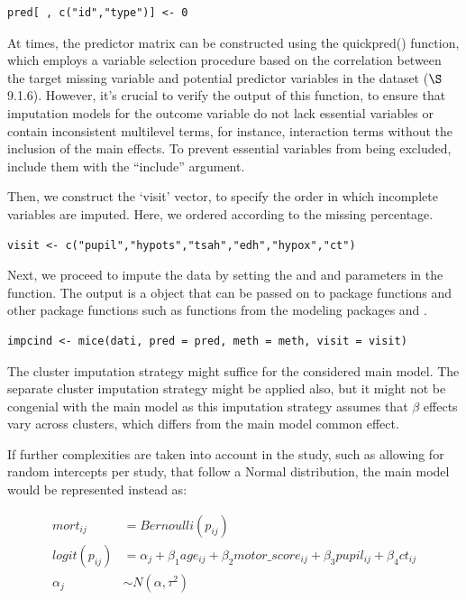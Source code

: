 \documentclass[
  article]{jss}
\begin{document}
\begin{verbatim}
pred[ , c("id","type")] <- 0
\end{verbatim}

At times, the predictor matrix can be constructed using the quickpred()
function, which employs a variable selection procedure based on the
correlation between the target missing variable and potential predictor
variables in the dataset \citep{buur18}(\(\S\) 9.1.6). However, it's
crucial to verify the output of this function, to ensure that imputation
models for the outcome variable do not lack essential variables or
contain inconsistent multilevel terms, for instance, interaction terms
without the inclusion of the main effects. To prevent essential
variables from being excluded, include them with the ``include''
argument.

Then, we construct the `visit' vector, to specify the order in which
incomplete variables are imputed. Here, we ordered according to the
missing percentage.

\begin{verbatim}
visit <- c("pupil","hypots","tsah","edh","hypox","ct")
\end{verbatim}

Next, we proceed to impute the data by setting the  and
 and  parameters in the  function. The
output is a  object that can be passed on to 
package functions and other package functions such as functions from the
modeling packages  and .

\begin{verbatim}
impcind <- mice(dati, pred = pred, meth = meth, visit = visit) 
\end{verbatim}

The cluster imputation strategy might suffice for the considered main
model. The separate cluster imputation strategy might be applied also,
but it might not be congenial with the main model as this imputation
strategy assumes that \(\beta\) effects vary across clusters, which
differs from the main model common effect.

If further complexities are taken into account in the study, such as
allowing for random intercepts per study, that follow a Normal
distribution, the main model would be represented instead as:

\begin{align*}
 mort_{ij}& = Bernoulli(p_{ij})\\
logit(p_{ij})&= \alpha_j +  \beta_1age_{ij}+ \beta_2motor\_score_{ij} + \beta_3pupil_{ij} + \beta_4ct_{ij}\\\label{eqn:2mod1} \tag{main model : 2}
\alpha_j &\sim N(\alpha,\tau^2) 
\end{align*}
\end{document}

